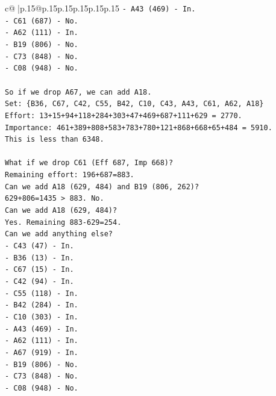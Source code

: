 \documentclass{article}
\begin{document}
{\begin{supertabular}{c@{$\;$}|p{.15\linewidth}@{}p{.15\linewidth}p{.15\linewidth}p{.15\linewidth}p{.15\linewidth}p{.15\linewidth}}
{{{\texttt{{-} A43 (469) {-} In.} \\
\texttt{{-} C61 (687) {-} No.} \\
\texttt{{-} A62 (111) {-} In.} \\
\texttt{{-} B19 (806) {-} No.} \\
\texttt{{-} C73 (848) {-} No.} \\
\texttt{{-} C08 (948) {-} No.} \\
\\ 
\texttt{So if we drop A67, we can add A18.} \\
\texttt{Set: \{B36, C67, C42, C55, B42, C10, C43, A43, C61, A62, A18\}} \\
\texttt{Effort: 13+15+94+118+284+303+47+469+687+111+629 = 2770.} \\
\texttt{Importance: 461+389+808+583+783+780+121+868+668+65+484 = 5910.} \\
\texttt{This is less than 6348.} \\
\\ 
\texttt{What if we drop C61 (Eff 687, Imp 668)?} \\
\texttt{Remaining effort: 196+687=883.} \\
\texttt{Can we add A18 (629, 484) and B19 (806, 262)?} \\
\texttt{629+806=1435 > 883. No.} \\
\texttt{Can we add A18 (629, 484)?} \\
\texttt{Yes. Remaining 883{-}629=254.} \\
\texttt{Can we add anything else?} \\
\texttt{{-} C43 (47) {-} In.} \\
\texttt{{-} B36 (13) {-} In.} \\
\texttt{{-} C67 (15) {-} In.} \\
\texttt{{-} C42 (94) {-} In.} \\
\texttt{{-} C55 (118) {-} In.} \\
\texttt{{-} B42 (284) {-} In.} \\
\texttt{{-} C10 (303) {-} In.} \\
\texttt{{-} A43 (469) {-} In.} \\
\texttt{{-} A62 (111) {-} In.} \\
\texttt{{-} A67 (919) {-} In.} \\
\texttt{{-} B19 (806) {-} No.} \\
\texttt{{-} C73 (848) {-} No.} \\
\texttt{{-} C08 (948) {-} No.} \\
\\ 
}}}
\end{supertabular}}
\end{document}

